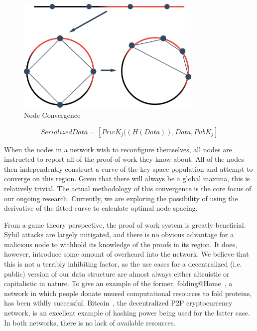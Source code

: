 \documentclass[10pt]{IEEEtran}
\begin{document}
\begin{figure}[!t]
\centering
\includegraphics[width=3.5in]{unevenDistro}
\caption{Node Convergence}
\label{fig_kSpaceUneven}
\end{figure}

\begin{equation} \label{eq:proof}
SerializedData = [PrivK_{j}((H(Data)), Data, PubK_{j}]
\end{equation}

\par When the nodes in a network wish to reconfigure themselves, all nodes are instructed to report all of the proof of work they know about. All of the nodes then independently construct a curve of the key space population and attempt to converge on this region. Given that there will always be a global maxima, this is relatively trivial. The actual methodology of this convergence is the core focus of our ongoing research. Currently, we are exploring the possibility of using the derivative of the fitted curve to calculate optimal node spacing.

\par From a game theory perspective, the proof of work system is greatly beneficial. Sybil attacks are largely mitigated, and there is no obvious advantage for a malicious node to withhold its knowledge of the proofs in its region. It does, however, introduce some amount of overheard into the network. We believe that this is not a terribly inhibiting factor, as the use cases for a decentralized (i.e. public) version of our data structure are almost always either altruistic or capitalistic in nature. To give an example of the former, folding@Home~\cite{Anderson:2002vr}, a network in which people donate unused computational resources to fold proteins, has been wildly successful. Bitcoin~\cite{Nakamoto:2008ti}, the decentralized P2P cryptocurrency network, is an excellent example of hashing power being used for the latter case. In both networks, there is no lack of available resources.
\end{document}

